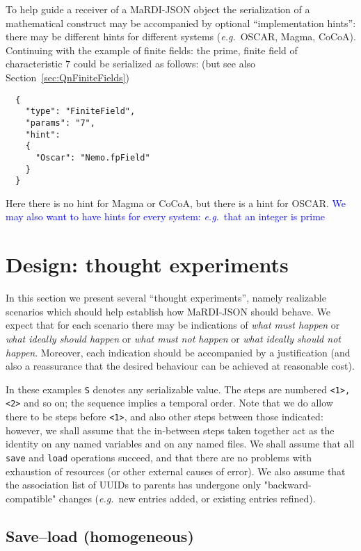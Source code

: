 \documentclass{article}
\newcommand{\MaRDIJSON}{MaRDI-JSON}
\newcommand \eg {\textit{e.g.}}
\def\blue#1{\textcolor{blue}{#1}}
\begin{document}
To help guide a receiver of a {\MaRDIJSON} object the serialization
of a mathematical construct may be accompanied by optional ``implementation hints'': there may be different hints for different systems (\eg~OSCAR, Magma, CoCoA).  Continuing with the example of finite fields: the prime, finite field of
characteristic $7$ could be serialized as follows: (but see also Section~\ref{sec:QnFiniteFields})
\begin{verbatim}
  {
    "type": "FiniteField",
    "params": "7",
    "hint":
    {
      "Oscar": "Nemo.fpField"
    }
  }
\end{verbatim}
Here there is no hint for Magma or CoCoA, but there is a hint for OSCAR.
\blue{We may also want to have hints for every system: \eg~that an integer
is prime}


\section{Design: thought experiments}
\label{sec:ThoughtExperiments}

In this section we present several ``thought experiments'', namely
realizable scenarios which should help establish how {\MaRDIJSON}
should behave.  We expect that for each scenario there may be
indications of \textit{what must happen} or \textit{what ideally should happen} or \textit{what must not happen} or \textit{what ideally should not happen}.
Moreover, each indication should be accompanied by a justification
(and also a reassurance that the desired behaviour can be achieved at
reasonable cost).

In these examples \texttt{S} denotes any serializable value.  The
steps are numbered \verb|<1>, <2>| and so on; the sequence implies a
temporal order.  Note that we do allow there to be steps before
\verb|<1>|, and also other steps between those indicated: however,
we shall assume that the in-between steps taken together act as the
identity on any named variables and on any named files.  We shall
assume that all \texttt{save} and \texttt{load} operations succeed,
and that there are no problems with exhaustion of resources (or other
external causes of error).  We also assume that the association list
of UUIDs to parents has undergone only "backward-compatible" changes
(\eg~new entries added, or existing entries refined).

\subsection{Save--load (homogeneous)}
\end{document}
